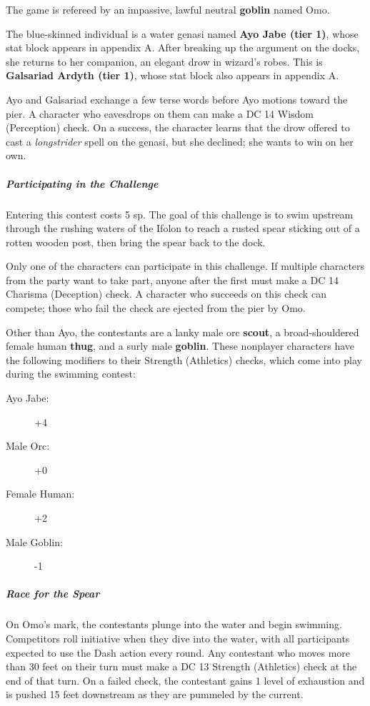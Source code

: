 \documentclass[10pt,a4paper,twoside,fancy,bg=print,twocolumn,openany,nodeprecatedcode]{dndbook}
\begin{document}
The game is refereed by an impassive, lawful neutral \textbf{goblin} named Omo.

The blue-skinned individual is a water genasi named \textbf{Ayo Jabe (tier 1)}, whose stat block appears in appendix A. After breaking up the argument on the docks, she returns to her companion, an elegant drow in wizard's robes. This is \textbf{Galsariad Ardyth (tier 1)}, whose stat block also appears in appendix A.

Ayo and Galsariad exchange a few terse words before Ayo motions toward the pier. A character who eavesdrops on them can make a DC 14 Wisdom (Perception) check. On a success, the character learns that the drow offered to cast a \textit{longstrider} spell on the genasi, but she declined; she wants to win on her own.

\subparagraph{Participating in the Challenge}
Entering this contest costs 5 sp. The goal of this challenge is to swim upstream through the rushing waters of the Ifolon to reach a rusted spear sticking out of a rotten wooden post, then bring the spear back to the dock.

Only one of the characters can participate in this challenge. If multiple characters from the party want to take part, anyone after the first must make a DC 14 Charisma (Deception) check. A character who succeeds on this check can compete; those who fail the check are ejected from the pier by Omo.

Other than Ayo, the contestants are a lanky male orc \textbf{scout}, a broad-shouldered female human \textbf{thug}, and a surly male \textbf{goblin}. These nonplayer characters have the following modifiers to their Strength (Athletics) checks, which come into play during the swimming contest:


\begin{description}
\item[Ayo Jabe:]
+4
\item[Male Orc:]
+0
\item[Female Human:]
+2
\item[Male Goblin:]
-1
\end{description}

\subparagraph{Race for the Spear}
On Omo's mark, the contestants plunge into the water and begin swimming. Competitors roll initiative when they dive into the water, with all participants expected to use the Dash action every round. Any contestant who moves more than 30 feet on their turn must make a DC 13 Strength (Athletics) check at the end of that turn. On a failed check, the contestant gains 1 level of exhaustion and is pushed 15 feet downstream as they are pummeled by the current.
\end{document}
